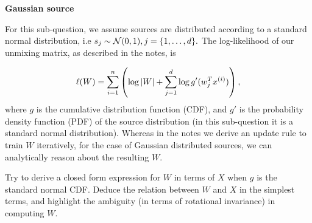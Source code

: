 \item {} \textbf{Gaussian source}

For this sub-question, we assume sources are distributed according to a standard normal distribution, i.e $s_j \sim \mathcal{N}(0,1), j=\{1,\ldots,{d}\}.$ The log-likelihood of our unmixing matrix, as described in the notes, is

$$\ell(W) = \sum_{i=1}^{n}\left(\log|W| + \sum_{j=1}^{d} \log g'(w_j^Tx^{(i)})\right),$$ where $g$ is the cumulative distribution function (CDF), and $g'$ is the probability density function (PDF) of the source distribution (in this sub-question it is a standard normal distribution). Whereas in the notes we derive an update rule to train $W$ iteratively, for the case of Gaussian distributed sources, we can analytically reason about the resulting $W$.

Try to derive a closed form expression for $W$ in terms of $X$ when $g$ is the standard normal CDF. Deduce the relation between $W$ and $X$ in the simplest terms, and highlight the ambiguity (in terms of rotational invariance) in computing $W$.
